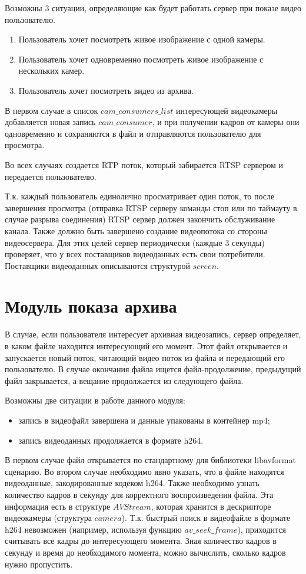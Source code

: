 Возможны 3 ситуации, определяющие как будет работать сервер при показе видео пользователю.
\begin{enumerate}
	\item Пользователь хочет посмотреть живое изображение с одной камеры.
	\item Пользователь хочет одновременно посмотреть живое изображение с нескольких камер.
	\item Пользователь хочет посмотреть видео из архива.
\end{enumerate}

В первом случае в список $cam\_consumers\_list$ интересующей видеокамеры добавляется новая запись
$cam\_consumer$, и при получении кадров от камеры они одновременно и сохраняются в файл и отправляются
пользователю для просмотра.

Во всех случаях создается RTP поток, который забирается RTSP сервером и передается пользователю.

Т.к. каждый пользователь единолично просматривает один поток, то после завершения просмотра
(отправка RTSP серверу команды стоп или по таймауту в случае разрыва соединения) RTSP сервер
должен закончить обслуживание канала.
Также должно быть завершено создание видеопотока со стороны видеосервера.
Для этих целей сервер периодически (каждые 3 секунды) проверяет, что у всех поставщиков
видеоданных есть свои потребители. Поставщики видеоданных описываются структурой $screen$.

\section{Модуль показа архива}
В случае, если пользователя интересует архивная видеозапись, сервер определяет, в каком файле
находится интересующий его момент. Этот файл открывается и запускается новый поток, читающий видео
поток из файла и передающий его пользователю. В случае окончания файла ищется файл-продолжение,
предыдущий файл закрывается, а вещание продолжается из следующего файла.

Возможны две ситуации в работе данного модуля:

\begin{itemize}
 \item запись в видеофайл завершена и данные упакованы в контейнер mp4;
 \item запись видеоданных продолжается в формате h264.
\end{itemize}

В первом случае файл открывается по стандартному для библиотеки libavformat сценарию.
Во втором случае необходимо явно указать, что в файле находятся видеоданные, закодированные
кодеком h264. Также необходимо узнать количество кадров в секунду для корректного
воспроизведения файла. Эта информация есть в структуре $AVStream$, которая хранится
в дескрипторе видеокамеры (структура $camera$). Т.к. быстрый поиск в видеофайле в формате h264
невозможен (например, используя функцию $av\_seek\_frame$), приходится считывать все кадры до
интересующего момента. Зная количество кадров в секунду и время до необходимого момента, можно
вычислить, сколько кадров нужно пропустить.

